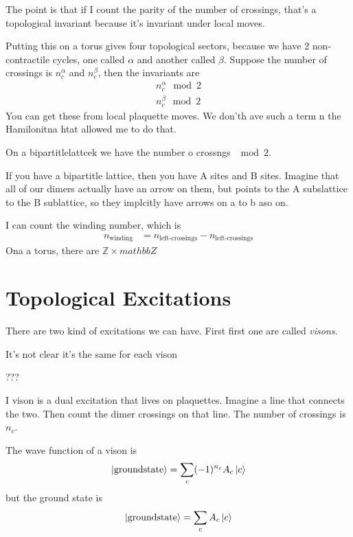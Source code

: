 The point is that if I count the parity of the number of crossings,
that's a topological invariant because it's invariant under local moves.

Putting this on a torus gives four topological sectors,
because we have 2 non-contractile cycles,
one called $\alpha$ and another called $\beta$.
Suppose the number of crossings is $n_c^\alpha$ and $n_c^\beta$,
then the invariants are
\begin{align}
    n_c^\alpha\mod 2\\
    n_c^\beta\mod 2
\end{align}
You can get these from local plaquette moves.
We don'th ave such a term n the Hamilonitna htat allowed me to do that.

On a bipartitlelattcek we have the number o crossngs $\mod 2$.

If you have a bipartitle lattice,
then you have A sites and B sites.
Imagine that all of our dimers actually have an arrow on them,
but points to the A subslattice to the B sublattice,
so they implcitly have arrows on a to b aso on.

I can count the winding number,
which is
\begin{align}
    n_{\textrm{winding}}
    &=
    n_{\textrm{left-crossings}}
    - n_{\textrm{left-crossings}}
\end{align}
Ona a torus,
there are $\mathbb{Z}\times mathbb{Z}$

\section{Topological Excitations}
There are two kind of excitations we can have.
First first one are called \emph{visons}.

\begin{question}
    It's not clear it's the same for each vison
\end{question}

???

I vison is a dual excitation that lives on plaquettes.
Imagine a line that connects the two.
Then count the dimer crossings on that line.
The number of crossings is $n_c$.

The wave function of a vison is
\begin{align}
    \ket{\mathrm{ground state}} = \sum_c (-1)^{n_c} A_c \ket{c}
\end{align}
but the ground state is
\begin{align}
    \ket{\mathrm{ground state}} = \sum_c A_c \ket{c}
\end{align}

